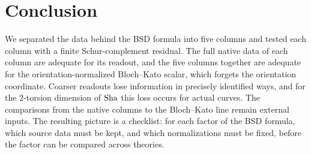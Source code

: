 \section{Conclusion}\label{sec:conclusion}

We separated the data behind the BSD formula into five columns and tested
each column with a finite Schur-complement residual.  The full native data
of each column are adequate for its readout, and the five columns together
are adequate for the orientation-normalized Bloch--Kato scalar, which
forgets the orientation coordinate.  Coarser readouts lose information in
precisely identified ways, and for the $2$-torsion dimension of $\operatorname{Sha}$
this loss occurs for actual curves.  The comparisons from the native
columns to the Bloch--Kato line remain external inputs.  The resulting
picture is a checklist: for each factor of the BSD formula, which source
data must be kept, and which normalizations must be fixed, before the
factor can be compared across theories.

